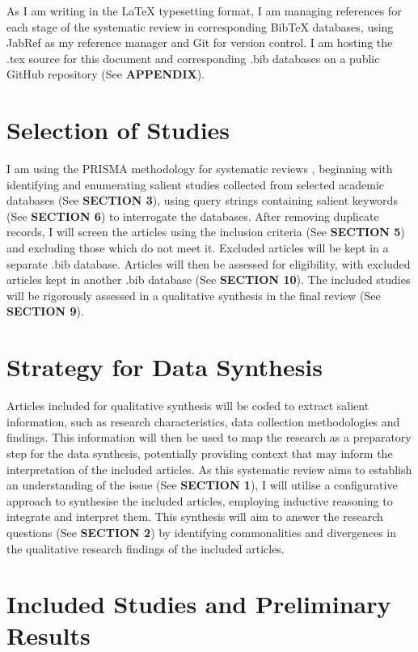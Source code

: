 \documentclass[british]{article}
\begin{document}
As I am writing in the LaTeX typesetting format, I am managing references
for each stage of the systematic review in corresponding BibTeX databases,
using JabRef as my reference manager and Git for version control.
I am hosting the .tex source for this document and corresponding .bib
databases on a public GitHub repository (See \textbf{APPENDIX}).

\section{Selection of Studies}

I am using the PRISMA methodology for systematic reviews \cite{moher2010preferred},
beginning with identifying and enumerating salient studies collected
from selected academic databases (See \textbf{SECTION 3}), using query
strings containing salient keywords (See \textbf{SECTION 6}) to interrogate
the databases. After removing duplicate records, I will screen the
articles using the inclusion criteria (See \textbf{SECTION 5}) and
excluding those which do not meet it. Excluded articles will be kept
in a separate .bib database. Articles will then be assessed for eligibility,
with excluded articles kept in another .bib database (See \textbf{SECTION
10}). The included studies will be rigorously assessed in a qualitative
synthesis in the final review (See \textbf{SECTION 9}). 

\section{Strategy for Data Synthesis}

Articles included for qualitative synthesis will be coded to extract
salient information, such as research characteristics, data collection
methodologies and findings. This information will then be used to
map the research as a preparatory step for the data synthesis, potentially
providing context that may inform the interpretation of the included
articles. As this systematic review aims to establish an understanding
of the issue (See \textbf{SECTION 1}), I will utilise a configurative
approach to synthesise the included articles, employing inductive
reasoning to integrate and interpret them. This synthesis will aim
to answer the research questions (See \textbf{SECTION 2}) by identifying
commonalities and divergences in the qualitative research findings
of the included articles.

\section{Included Studies and Preliminary Results}
\end{document}
